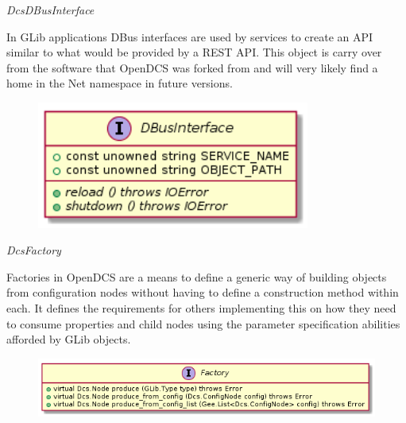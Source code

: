       \emph{DcsDBusInterface}

      \vspace*{-0.75cm}
      \begin{minipage}[t]{0.5\textwidth}
        \vspace*{0.5cm}
        In GLib applications DBus interfaces are used by services to create an
        API similar to what would be provided by a REST API. This object is
        carry over from the software that OpenDCS was forked from and will very
        likely find a home in the Net namespace in future versions.
      \end{minipage} \hfill
      \begin{minipage}[t]{0.45\textwidth}
        \begin{figure}[H]
          \includegraphics[width=0.8\textwidth]{figures/design/class/core/dbus-interface}
          \label{fig:dsg-classes-dbus-interface}
        \end{figure}
      \end{minipage}

      \emph{DcsFactory}

      \vspace*{-0.75cm}
      \begin{minipage}[t]{0.5\textwidth}
        \vspace*{0.5cm}
        Factories in OpenDCS are a means to define a generic way of building
        objects from configuration nodes without having to define a construction
        method within each. It defines the requirements for others implementing
        this on how they need to consume properties and child nodes using the
        parameter specification abilities afforded by GLib objects.
      \end{minipage} \hfill
      \begin{minipage}[t]{0.45\textwidth}
        \begin{figure}[H]
          \includegraphics[width=\textwidth]{figures/design/class/core/factory}
          \label{fig:dsg-classes-factory}
        \end{figure}
      \end{minipage}

